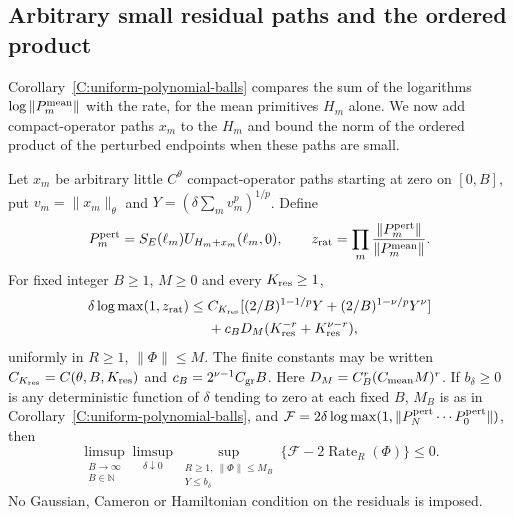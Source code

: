 \subsection{Arbitrary small residual paths and the ordered product}

Corollary~\ref{C:uniform-polynomial-balls} compares the sum of the logarithms
$\log\|P_m^{\rm mean}\|$ with the rate, for the mean primitives $H_m$ alone. We
now add compact-operator paths $x_m$ to the $H_m$ and bound the norm of the
ordered product of the perturbed endpoints when these paths are small.

\begin{proposition}
  \label{P:uniform-arbitrary-residual}
  Let $x_m$ be arbitrary little $C^\theta$ compact-operator paths starting at
  zero on $[0,B]$, put $v_m = \|x_m\|_\theta$ and $Y = (\delta\sum_m
  v_m^p)^{1/p}$. Define
  \[
    P_m^{\rm pert}=S_E(\ell_m)U_{H_m+x_m}(\ell_m,0),\qquad
    z_{\rm rat}=\prod_m\frac{\|P_m^{\rm pert}\|}{\|P_m^{\rm mean}\|}.
  \]
  For fixed integer $B \ge 1$, $M \ge 0$ and every $K_{\rm res} \ge 1$,
  \begin{align}
    \delta\log\max(1,z_{\rm rat})\le{}&
    C_{K_{\rm res}}[(2/B)^{1-1/p}Y+(2/B)^{1-\nu/p}Y^\nu]\notag\\
    &+c_BD_M(K_{\rm res}^{-r}+K_{\rm res}^{\nu-r}),
    \label{E:uniform-residual-ratio}
  \end{align}
  uniformly in $R \ge 1$, $\|\Phi\| \le M$. The finite constants may be written
  $C_{K_{\rm res}} = C(\theta,B,K_{\rm res})$ and $c_B = 2^{\nu-1}C_{\rm gr}B$.
  Here $D_M = C_B^r(C_{\rm mean}M)^r$. If $b_\delta \ge 0$ is any deterministic
  function of $\delta$ tending to zero at each fixed $B$, $M_B$ is as in
  Corollary~\ref{C:uniform-polynomial-balls}, and $\mathcal{F} =
  2\delta\log\max(1,\|P_N^{\rm pert}\cdots P_0^{\rm pert}\|)$, then
  \begin{equation}\label{E:uniform-residual-integrated-rate}
    \limsup_{\substack{B\to\infty\\B\in\mathbb{N}}}
    \limsup_{\delta\downarrow0}
    \sup_{\substack{R\ge1,\ \|\Phi\|\le M_B\\Y\le b_\delta}}
    \{\mathcal{F}-2\operatorname{Rate}_R(\Phi)\}\le0 .
  \end{equation}
  No Gaussian, Cameron or Hamiltonian condition on the residuals is imposed.
\end{proposition}

